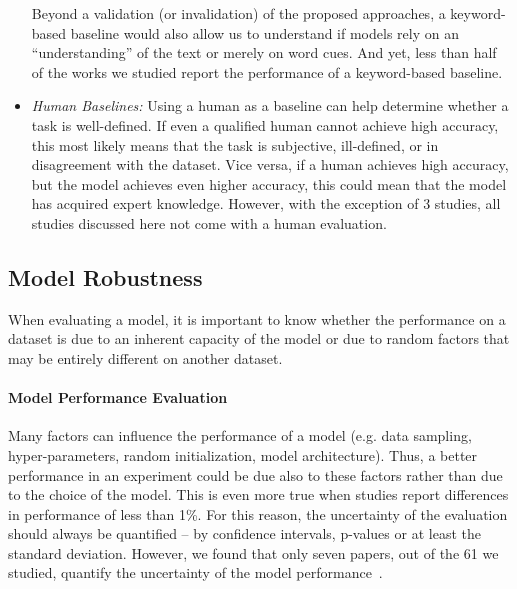 \begin{itemize}
    Beyond a validation (or invalidation) of the proposed approaches, a keyword-based baseline would also allow us to understand if models rely on an ``understanding'' of the text or merely on word cues.      And yet, less than half of the works we studied report the performance of a keyword-based baseline.
    \item \textit{Human Baselines:} Using a human as a baseline can help determine whether a task is well-defined. If even a qualified human cannot achieve high accuracy, this most likely means that the task is subjective, ill-defined, or in disagreement with the dataset. Vice versa, if a human achieves high accuracy, but the model achieves even higher accuracy, this could mean that the model has acquired expert knowledge. However, with the exception of 3 studies, all studies discussed here not come with a human evaluation.
\end{itemize}

\subsection{Model Robustness}
\label{sec:robustness}

When evaluating a model, it is important to know whether the performance on a dataset is due to an inherent capacity of the model or due to random factors that may be entirely different on another dataset.

\paragraph{Model Performance Evaluation} Many factors can influence the performance of a model (e.g. data sampling, hyper-parameters, random initialization, model architecture). Thus, a better performance in an experiment could be due also to these factors rather than due to the choice of the model. This is even more true when studies report differences in performance of less than 1\%. 
For this reason, the uncertainty of the evaluation should always be quantified -- 
by confidence intervals, p-values or at least the standard deviation.
However, we found that only seven papers, out of the 61 we studied, quantify the uncertainty of the model performance~\cite{nicolas_webersinke_climatebert_2021,varini_climatext_2020,bingler2023cheaptalkspecificitysentiment,Schimanski2024nature,schimanski_bridging_2023,LEE2023119726,tobias_schimanski_climatebert-netzero_2023}. 

